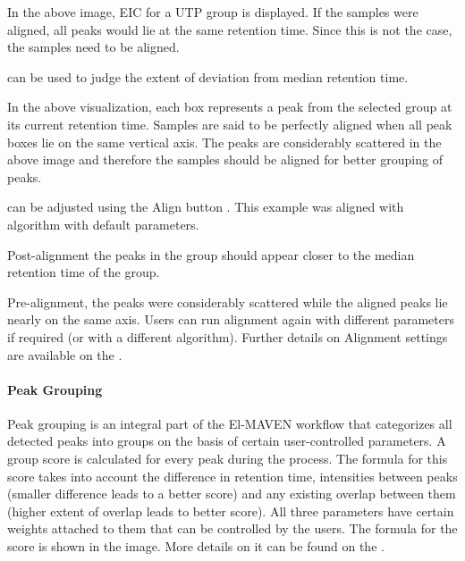 \documentclass[letterpaper,10pt,english,openany,oneside]{sphinxmanual}
\begin{document}

In the above image, EIC for a UTP group is displayed. If the samples were aligned, all peaks would lie at the same retention time. Since this is not the case, the samples need to be aligned.

  can be used to judge the extent of deviation from median retention time.


In the above visualization, each box represents a peak from the selected group at its current retention time. Samples are said to be perfectly aligned when all peak boxes lie on the same vertical axis. The peaks are considerably scattered in the above image and therefore the samples should be aligned for better grouping of peaks.


 can be adjusted using the Align button . This example was aligned with  algorithm with default parameters.


Post-alignment the peaks in the group should appear closer to the median retention time of the group.



Pre-alignment, the peaks were considerably scattered while the aligned peaks lie nearly on the same axis. Users can run alignment again with different parameters if required (or with a different algorithm). Further details on Alignment settings are available on the .


\paragraph{Peak Grouping}
\label{\detokenize{LabeledLCMSWorkflow:peak-grouping}}
Peak grouping is an integral part of the El-MAVEN workflow that categorizes all detected peaks into groups on the basis of certain user-controlled parameters. A group score is calculated for every peak during the process. The formula for this score takes into account the difference in retention time, intensities between peaks (smaller difference leads to a better score) and any existing overlap between them (higher extent of overlap leads to better score). All three parameters have certain weights attached to them that can be controlled by the users. The formula for the score is shown in the image. More details on it can be found on the .
\end{document}
